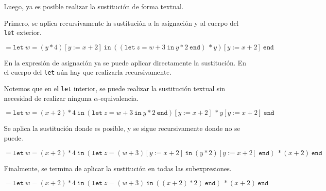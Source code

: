 \documentclass{article}
\begin{document}
\begin{enumerate}
{        Luego, ya es posible realizar la sustitución de forma textual.

        Primero, se aplica recursivamente la sustitución a la asignación y al
        cuerpo del \texttt{let} exterior.

        \[
            =
            \texttt{let} \ w = (y \ast 4)[y := x + 2] \ \texttt{in} \ 
            ((\texttt{let} \ z = w + 3 \ \texttt{in} \ 
            y \ast 2 \ \texttt{end}) \ \ast y) [y := x + 2] \ \texttt{end}
        \]

        En la expresión de asignación ya se puede aplicar directamente la
        sustitución. En el cuerpo del \texttt{let} aún hay que realizarla
        recursivamente. 

        Notemos que en el \texttt{let} interior, se puede realizar la
        sustitución textual sin necesidad de realizar ninguna
        $\alpha$-equivalencia.

        \[
            =
            \texttt{let} \ w = (x + 2) \ast 4 \ \texttt{in} \ 
            (\texttt{let} \ z = w + 3 \ \texttt{in} \ 
            y \ast 2 \ \texttt{end})[y := x + 2] \ \ast y [y := x + 2] \ 
            \texttt{end} 
        \]

        Se aplica la sustitución donde es posible, y se sigue recursivamente
        donde no se puede.

        \[
            =
            \texttt{let} \ w = (x + 2) \ast 4 \ \texttt{in} \ 
            (\texttt{let} \ z = (w + 3) [y := x + 2] \ \texttt{in} \ 
            (y \ast 2 ) [y := x + 2]\ \texttt{end}) \ \ast (x + 2) \ 
            \texttt{end} 
        \]

        Finalmente, se termina de aplicar la sustitución en todas las
        subexpresiones.

        \[
            =
            \texttt{let} \ w = (x + 2) \ast 4 \ \texttt{in} \ 
            (\texttt{let} \ z = (w + 3) \ \texttt{in} \ 
            ((x + 2) \ast 2 ) \ \texttt{end}) \ \ast (x + 2) \ 
            \texttt{end}
        \]
    	
    	}
    \end{enumerate}
\end{document}
